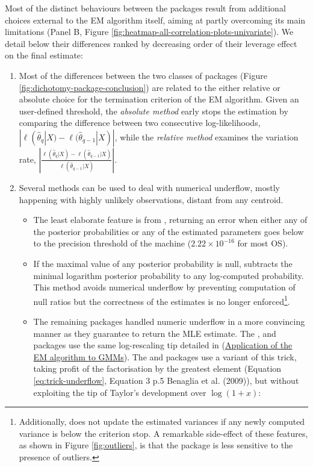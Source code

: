 \label{sec:em-differences}

Most of the distinct behaviours between the packages result from additional choices external to the EM algorithm itself, aiming at partly overcoming its main limitations (Panel B, Figure \ref{fig:heatmap-all-correlation-plots-univariate}). We detail below their differences ranked by decreasing order of their leverage effect on the final estimate:

\begin{enumerate}
\def\labelenumi{\arabic{enumi}.}
\tightlist
\item
  Most of the differences between the two classes of packages (Figure \ref{fig:dichotomy-package-conclusion}) are
  related to the either relative or absolute choice for the termination criterion of the EM algorithm. Given an user-defined threshold, the \emph{absolute method} early stops the estimation by comparing the difference between two consecutive log-likelihoods, \(|\ell(\hat{\theta}_{q}|X) - \ell(\hat{\theta}_{q-1}|X)|\), while the \emph{relative method} examines the variation rate, \(\left\lvert\frac{\ell(\hat{\theta}_{q}|X) - \ell(\hat{\theta}_{q-1}|X)}{\ell(\hat{\theta}_{q-1}|X)}\right\lvert\).
\item
  Several methods can be used to deal with numerical underflow, mostly happening with highly unlikely observations, distant from any centroid.

  \begin{itemize}
  \item
    The least elaborate feature is from , returning an error when either any of the posterior probabilities or any of the estimated parameters goes below to the precision threshold of the machine (\ensuremath{2.22\times 10^{-16}} for most OS).
  \item
    If the maximal value of any posterior probability is null,  subtracts the minimal logarithm posterior probability to any log-computed probability. This method avoids numerical
    underflow by preventing computation of null ratios but the correctness of the estimates is no longer enforced\footnote{Additionally,  does
      not update the estimated variances if any newly computed variance is
      below the criterion stop. A remarkable side-effect of these features, as
      shown in Figure \ref{fig:outliers}, is that the  package is
      less sensitive to the presence of outliers.}.
  \item
    The remaining packages handled numeric underflow in a more convincing
    manner as they guarantee to return the MLE estimate. The ,  and 
    packages use the same log-rescaling tip detailed in (\protect\hyperlink{application-of-the-em-algorithm-to-gmms}{Application of the EM algorithm to GMMs}). The  and
     packages use a variant of this trick, taking profit of the factorisation
    by the greatest element (Equation \eqref{eq:trick-underflow}, Equation 3 p.5 Benaglia et al. (2009)), but without exploiting the tip of Taylor's development over \(\log(1+x)\):
  \end{itemize}
\end{enumerate}

